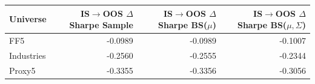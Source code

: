 \begin{tabular}{lrrr}
\toprule
Universe & IS$\to$OOS $\Delta$Sharpe Sample & IS$\to$OOS $\Delta$Sharpe BS($\mu$) & IS$\to$OOS $\Delta$Sharpe BS($\mu,\Sigma$) \\
\midrule
FF5 & -0.0989 & -0.0989 & -0.1007 \\
Industries & -0.2560 & -0.2555 & -0.2344 \\
Proxy5 & -0.3355 & -0.3356 & -0.3056 \\
\bottomrule
\end{tabular}
